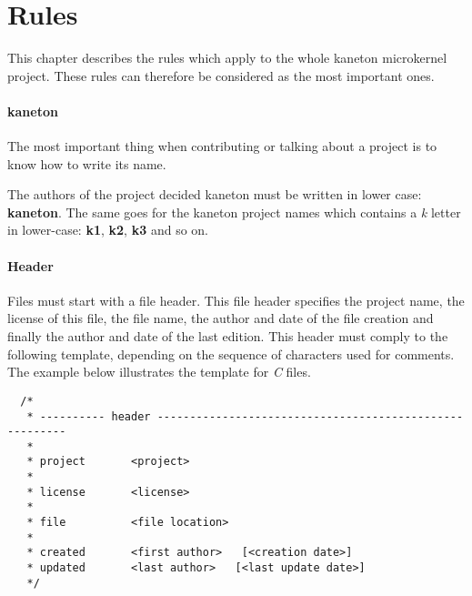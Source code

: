%
%
%
%
%
%

%
%

\chapter{Rules}
\label{chapter:rules}

This chapter describes the rules which apply to the whole kaneton microkernel
project. These rules can therefore be considered as the most important ones.

\newpage

%
%


\subsubsection{kaneton}

The most important thing when contributing or talking about a project is
to know how to write its name.

The authors of the project decided kaneton must be written in lower case:
\textbf{kaneton}. The same goes for the kaneton project names which contains
a \textit{k} letter in lower-case: \textbf{k1}, \textbf{k2}, \textbf{k3} and
so on.


\subsubsection{Header}

Files must start with a file header. This file header specifies the
project name, the license of this file, the file name, the author and
date of the file creation and finally the author and date of the last
edition. This header must comply to the following template, depending
on the sequence of characters used for comments. The example below illustrates
the template for \textit{C} files.

\begin{verbatim}
  /*
   * ---------- header --------------------------------------------------------
   *
   * project       <project>
   *
   * license       <license>
   *
   * file          <file location>
   *
   * created       <first author>   [<creation date>]
   * updated       <last author>   [<last update date>]
   */
\end{verbatim}

